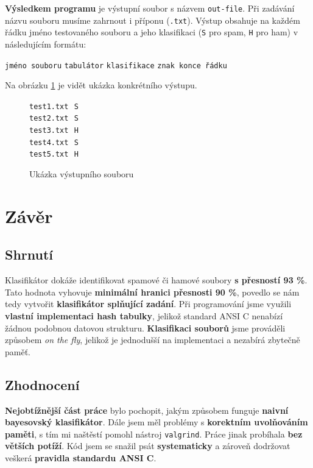 \documentclass[12pt]{report}
\newcommand\la{\textlangle}  					%
\newcommand\ra{\textrangle}						%
\newcommand\laratexttt[1]{\la\texttt{#1}\ra}	%
\newcommand\indentt[1]{						
	\setlength\parindent{5mm}
	#1
	\setlength\parindent{0mm}
	}											%
\begin{document}
	\textbf{Výsledkem programu} je výstupní soubor s názvem \laratexttt{out-file}. Při zadávání názvu souboru musíme zahrnout i příponu (\texttt{.txt}). Výstup obsahuje na každém řádku jméno testovaného souboru a jeho klasifikaci (\texttt{S} pro spam, \texttt{H} pro ham) v následujícím formátu:
	
	\indentt{\laratexttt{jméno souboru} \laratexttt{tabulátor} \laratexttt{klasifikace} \laratexttt{znak konce řádku}}

	Na obrázku \ref{fig:vystup} je vidět ukázka konkrétního výstupu.
	
	\begin{figure}
		\centering
		\begin{minipage}{40mm}
			\texttt{test1.txt}\,\tab\, \texttt{S}\, \return\\
			\texttt{test2.txt}\,\tab\, \texttt{S}\, \return\\
			\texttt{test3.txt}\,\tab\, \texttt{H}\, \return\\
			\texttt{test4.txt}\,\tab\, \texttt{S}\, \return\\
			\texttt{test5.txt}\,\tab\, \texttt{H}\, \return
		\end{minipage}
		\caption{Ukázka výstupního souboru}
		\label{fig:vystup}
	\end{figure}
	
	\chapter{Závěr}
	
	\section{Shrnutí}
	Klasifikátor dokáže identifikovat spamové či hamové soubory \textbf{s přesností 93 \%}. Tato hodnota vyhovuje \textbf{minimální hranici přesnosti 90 \%}, povedlo se nám tedy vytvořit \textbf{klasifikátor splňující zadání}. Při programování jsme využili \textbf{vlastní implementaci hash tabulky}, jelikož standard ANSI C nenabízí žádnou podobnou datovou strukturu. \textbf{Klasifikaci souborů} jsme prováděli způsobem \textit{on the fly}, jelikož je jednodušší na implementaci a nezabírá zbytečně paměť.
	
	\section{Zhodnocení}
	\textbf{Nejobtížnější část práce} bylo pochopit, jakým způsobem funguje \textbf{naivní bayesovský klasifikátor}. Dále jsem měl problémy s \textbf{korektním uvolňováním paměti}, s tím mi naštěstí pomohl nástroj \texttt{valgrind}. Práce jinak probíhala \textbf{bez větších potíží}. Kód jsem se snažil psát \textbf{systematicky} a zároveň dodržovat veškerá \textbf{pravidla standardu ANSI C}.
	
\end{document}

